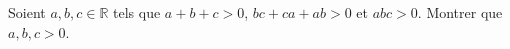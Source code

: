 Soient $a, b, c \in \mathbb{R}$ tels que $a + b + c > 0$, $bc + ca + ab > 0$ et $abc > 0$. Montrer que $a, b, c > 0$.
